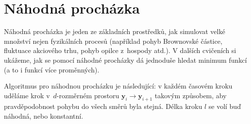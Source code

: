 \documentclass[a4paper,11pt,twoside]{article}
\def\vector#1{\boldsymbol{#1}}								%
\begin{document}
\section{Náhodná procházka}\label{sec:RandomWalk}
    Náhodná procházka je jeden ze základních prostředků, jak simulovat velké množství nejen fyzikálních procesů (například pohyb Brownovské částice, fluktuace akciového trhu, pohyb opilce z~hospody atd.).
    V dalších cvičeních si ukážeme, jak se pomocí náhodné procházky dá jednoduše hledat minimum funkcí (a to i funkcí více proměnných). 

    Algoritmus pro náhodnou procházku je následující: v každém časovém kroku uděláme krok v~$d$-rozměrném prostoru $\vector{y}_{i}\rightarrow\vector{y}_{i+1}$ takovým způsobem, aby pravděpodobnost pohybu do všech směrů byla stejná.
    Délka kroku $l$ se volí buď náhodná, nebo konstantní.
\end{document}
